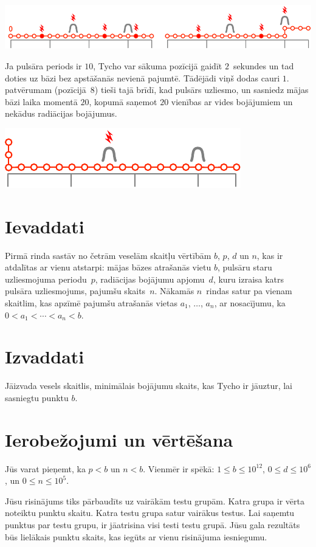 \includegraphics[width=.8\textwidth]{img/sample1_2.pdf}

Ja pulsāra periods ir $10$, Tycho var sākuma pozīcijā gaidīt $2$~sekundes un tad doties uz bāzi bez apstāšanās nevienā pajumtē.
Tādējādi viņš dodas cauri $1.$ patvērumam (pozīcijā~$8$) tieši tajā brīdī, kad pulsārs uzliesmo, un sasniedz mājas bāzi laika momentā $20$, kopumā saņemot $20$ vienības ar vides bojājumiem un nekādus radiācijas bojājumus.

\includegraphics[width=.4\textwidth]{img/sample3.pdf}

\section*{Ievaddati}

Pirmā rinda sastāv no četrām veselām skaitļu vērtībām $b$, $p$, $d$ un $n$, kas ir atdalītas ar vienu atstarpi:
mājas bāzes atrašanās vietu $b$,
pulsāru staru uzliesmojuma periodu~$p$,
radiācijas bojājumu apjomu~$d$, kuru izraisa katrs pulsāra uzliesmojums,
pajumšu skaits~$n$.
Nākamās $n$~rindas satur pa vienam skaitlim, kas apzīmē pajumšu atrašanās vietas $a_1$, $\ldots$, $a_n$, ar nosacījumu, ka
$0<a_1<\cdots <a_n< b$. %

\section*{Izvaddati}

Jāizvada vesels skaitlis, minimālais bojājumu skaits, kas Tycho ir jāuztur, lai sasniegtu punktu $b$.


\section*{Ierobežojumi un vērtēšana}

Jūs varat pieņemt, ka
$p < b$ %
un
$n < b$. %
Vienmēr ir spēkā:
$1\leq b\leq 10^{12}$, %
$0\leq d \leq 10^6$, %
un
$0\leq n \leq 10^5$. %

Jūsu risinājums tiks pārbaudīts uz vairākām testu grupām. Katra grupa ir vērta noteiktu punktu skaitu.
Katra testu grupa satur vairākus testus.
Lai saņemtu punktus par testu grupu, ir jāatrisina visi testi testu grupā.
Jūsu gala rezultāts būs lielākais punktu skaits, kas iegūts ar vienu risinājuma iesniegumu.

